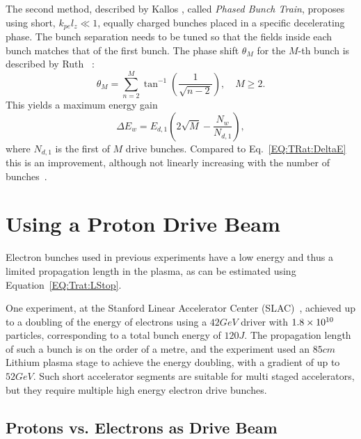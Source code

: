 The second method, described by Kallos \etal, called \textit{Phased Bunch Train}, proposes using short, $k_{pe}l_{z} \ll 1$, equally charged bunches placed in a specific decelerating phase.
The bunch separation needs to be tuned so that the fields inside each bunch matches that of the first bunch.
The phase shift $\theta_{M}$ for the $M$-th bunch is described by Ruth \etal~\cite{ruth:1985}:
\begin{equation}
    \theta_{M} = \sum^{M}_{n=2}\tan^{-1}\left(\frac{1}{\sqrt{n-2}}\right),\quad M \geq 2. \label{EQ:TrainPhase}
\end{equation}
This yields a maximum energy gain
\begin{equation}
    \Delta E_{w} = E_{d,1}\left(2\sqrt{M}-\frac{N_{w}}{N_{d,1}}\right), \label{EQ:TrainPhaseMaxE}
\end{equation}
where $N_{d,1}$ is the first of $M$ drive bunches.
Compared to Eq.~\ref{EQ:TRat:DeltaE} this is an improvement, although not linearly increasing with the number of bunches~\cite{ruth:1985}.

\section{Using a Proton Drive Beam}
\label{Int:DBeam}

Electron bunches used in previous experiments have a low energy and thus a limited propagation length in the plasma, as can be estimated using Equation~\ref{EQ:Trat:LStop}.

One experiment, at the Stanford Linear Accelerator Center (SLAC)~\cite{blumenfeld:2007}, achieved up to a doubling of the energy of electrons using a $42\unit{GeV}$ driver with $1.8\times 10^{10}$ particles, corresponding to a total bunch energy of $120\unit{J}$.
The propagation length of such a bunch is on the order of a metre, and the experiment used an $85\unit{cm}$ Lithium plasma stage to achieve the energy doubling, with a gradient of up to $52\unit{GeV}$.
Such short accelerator segments are suitable for multi staged accelerators, but they require multiple high energy electron drive bunches. 

\subsection{Protons vs. Electrons as Drive Beam}
\label{Int:DBeam:PDPWFA}

